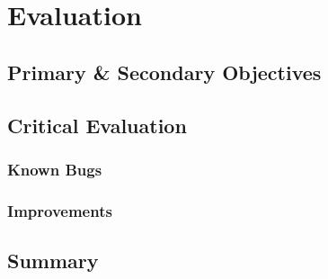 \chapter{Evaluation}







\section{Primary \& Secondary Objectives}

\section{Critical Evaluation}

\subsection{Known Bugs}

\subsection{Improvements}

\section{Summary}